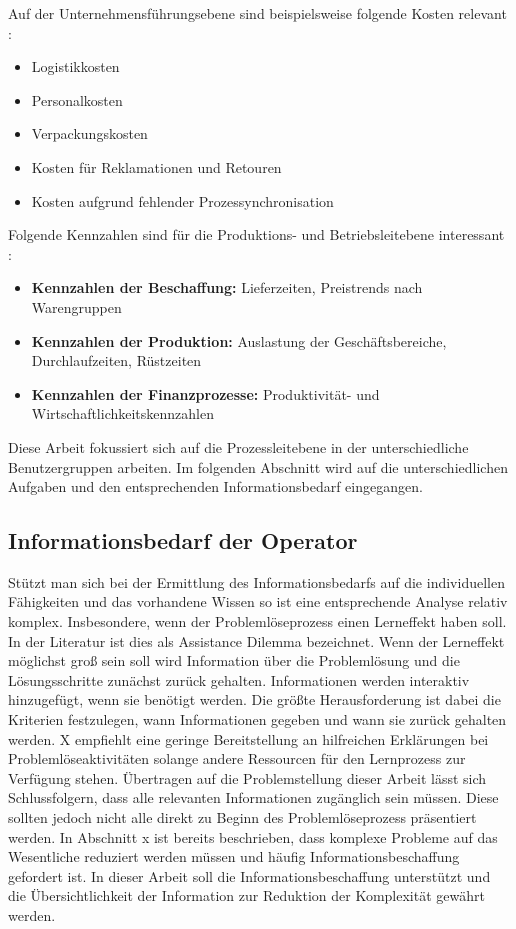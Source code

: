 Auf der Unternehmensführungsebene sind beispielsweise folgende Kosten relevant  \cite{Kunstler2014}:
\begin{itemize}
\item Logistikkosten
\item Personalkosten
\item Verpackungskosten
\item Kosten für Reklamationen und Retouren
\item Kosten aufgrund fehlender Prozessynchronisation
\end{itemize}
Folgende Kennzahlen sind für die Produktions- und Betriebsleitebene interessant \cite{Kunstler2014}:
\begin{itemize}
\item \textbf{Kennzahlen der Beschaffung:} Lieferzeiten, Preistrends nach Warengruppen
\item \textbf{Kennzahlen der Produktion:} Auslastung der Geschäftsbereiche, Durchlaufzeiten, Rüstzeiten
\item \textbf{Kennzahlen der Finanzprozesse:} Produktivität- und Wirtschaftlichkeitskennzahlen
\end{itemize}

Diese Arbeit fokussiert sich auf die Prozessleitebene in der unterschiedliche Benutzergruppen arbeiten. Im folgenden Abschnitt wird auf die unterschiedlichen Aufgaben und den entsprechenden Informationsbedarf eingegangen.

\subsection{Informationsbedarf der Operator}
Stützt man sich bei der Ermittlung des Informationsbedarfs auf die individuellen Fähigkeiten und das vorhandene Wissen so ist eine entsprechende Analyse relativ komplex. Insbesondere, wenn der Problemlöseprozess einen Lerneffekt haben soll. In der Literatur ist dies als Assistance Dilemma bezeichnet. Wenn der Lerneffekt möglichst groß sein soll wird Information über die Problemlösung und die Lösungsschritte zunächst zurück gehalten. Informationen werden interaktiv hinzugefügt, wenn sie benötigt werden. Die größte Herausforderung ist dabei die Kriterien festzulegen, wann Informationen gegeben und wann sie zurück gehalten werden. \cite{}  X empfiehlt eine geringe Bereitstellung an hilfreichen Erklärungen bei Problemlöseaktivitäten solange andere Ressourcen für den Lernprozess zur Verfügung stehen. Übertragen auf die Problemstellung dieser Arbeit lässt sich Schlussfolgern, dass alle relevanten Informationen zugänglich sein müssen. Diese sollten jedoch nicht alle direkt zu Beginn des Problemlöseprozess präsentiert werden. In Abschnitt x ist bereits beschrieben, dass komplexe Probleme auf das Wesentliche reduziert werden müssen und häufig Informationsbeschaffung gefordert ist. In dieser Arbeit soll die Informationsbeschaffung unterstützt und die Übersichtlichkeit der Information zur Reduktion der Komplexität gewährt werden.

